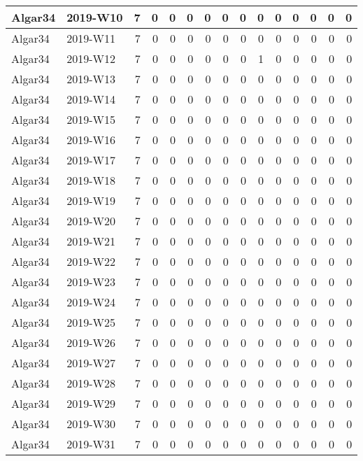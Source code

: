 \documentclass[]{book}
\begin{document}
\begin{table}
\begin{tabular}[t]{l|l|r|r|r|r|r|r|r|r|r|r|r|r|r}
\hline
Algar34 & 2019-W10 & 7 & 0 & 0 & 0 & 0 & 0 & 0 & 0 & 0 & 0 & 0 & 0 & 0\\
\hline
Algar34 & 2019-W11 & 7 & 0 & 0 & 0 & 0 & 0 & 0 & 0 & 0 & 0 & 0 & 0 & 0\\
\hline
Algar34 & 2019-W12 & 7 & 0 & 0 & 0 & 0 & 0 & 0 & 1 & 0 & 0 & 0 & 0 & 0\\
\hline
Algar34 & 2019-W13 & 7 & 0 & 0 & 0 & 0 & 0 & 0 & 0 & 0 & 0 & 0 & 0 & 0\\
\hline
Algar34 & 2019-W14 & 7 & 0 & 0 & 0 & 0 & 0 & 0 & 0 & 0 & 0 & 0 & 0 & 0\\
\hline
Algar34 & 2019-W15 & 7 & 0 & 0 & 0 & 0 & 0 & 0 & 0 & 0 & 0 & 0 & 0 & 0\\
\hline
Algar34 & 2019-W16 & 7 & 0 & 0 & 0 & 0 & 0 & 0 & 0 & 0 & 0 & 0 & 0 & 0\\
\hline
Algar34 & 2019-W17 & 7 & 0 & 0 & 0 & 0 & 0 & 0 & 0 & 0 & 0 & 0 & 0 & 0\\
\hline
Algar34 & 2019-W18 & 7 & 0 & 0 & 0 & 0 & 0 & 0 & 0 & 0 & 0 & 0 & 0 & 0\\
\hline
Algar34 & 2019-W19 & 7 & 0 & 0 & 0 & 0 & 0 & 0 & 0 & 0 & 0 & 0 & 0 & 0\\
\hline
Algar34 & 2019-W20 & 7 & 0 & 0 & 0 & 0 & 0 & 0 & 0 & 0 & 0 & 0 & 0 & 0\\
\hline
Algar34 & 2019-W21 & 7 & 0 & 0 & 0 & 0 & 0 & 0 & 0 & 0 & 0 & 0 & 0 & 0\\
\hline
Algar34 & 2019-W22 & 7 & 0 & 0 & 0 & 0 & 0 & 0 & 0 & 0 & 0 & 0 & 0 & 0\\
\hline
Algar34 & 2019-W23 & 7 & 0 & 0 & 0 & 0 & 0 & 0 & 0 & 0 & 0 & 0 & 0 & 0\\
\hline
Algar34 & 2019-W24 & 7 & 0 & 0 & 0 & 0 & 0 & 0 & 0 & 0 & 0 & 0 & 0 & 0\\
\hline
Algar34 & 2019-W25 & 7 & 0 & 0 & 0 & 0 & 0 & 0 & 0 & 0 & 0 & 0 & 0 & 0\\
\hline
Algar34 & 2019-W26 & 7 & 0 & 0 & 0 & 0 & 0 & 0 & 0 & 0 & 0 & 0 & 0 & 0\\
\hline
Algar34 & 2019-W27 & 7 & 0 & 0 & 0 & 0 & 0 & 0 & 0 & 0 & 0 & 0 & 0 & 0\\
\hline
Algar34 & 2019-W28 & 7 & 0 & 0 & 0 & 0 & 0 & 0 & 0 & 0 & 0 & 0 & 0 & 0\\
\hline
Algar34 & 2019-W29 & 7 & 0 & 0 & 0 & 0 & 0 & 0 & 0 & 0 & 0 & 0 & 0 & 0\\
\hline
Algar34 & 2019-W30 & 7 & 0 & 0 & 0 & 0 & 0 & 0 & 0 & 0 & 0 & 0 & 0 & 0\\
\hline
Algar34 & 2019-W31 & 7 & 0 & 0 & 0 & 0 & 0 & 0 & 0 & 0 & 0 & 0 & 0 & 0\\

\end{tabular}
\end{table}
\end{document}
